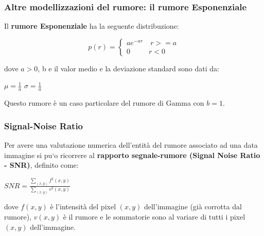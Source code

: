 
\subsubsection{Altre modellizzazioni del rumore: il rumore Esponenziale}
Il \textbf{rumore Esponenziale} ha la seguente distribuzione:

\begin{center}
    $$
        p(r) = \left\{ \begin{array}{cl}
            ae^{-ar} & \ r >= a \\
            0        & r<0
        \end{array} \right.
    $$
\end{center}
dove $a > 0$, b e il valor medio e la deviazione standard sono dati da:

\begin{center}
    $\mu = \frac{1}{a}$ $\sigma = \frac{1}{a}$
\end{center}

Questo rumore è un caso particolare del rumore di Gamma con $b = 1$.


\subsubsection{Signal-Noise Ratio}
Per avere una valutazione numerica dell’entità del rumore associato ad una data immagine si pu`o ricorrere al \textbf{rapporto segnale-rumore
    (Signal Noise Ratio - SNR)}, definito come:
\begin{center}
    $
        SNR = \frac{\sum_{(x,y)}^{}f^2(x,y)}{\sum_{(x,y)}^{}v^2(x,y)}
    $
\end{center}
dove $f(x, y)$ è l’intensità del pixel $(x, y)$ dell’immagine (già corrotta dal rumore), $v(x, y)$ è il rumore e le sommatorie sono al
variare di tutti i pixel $(x, y)$ dell’immagine.
